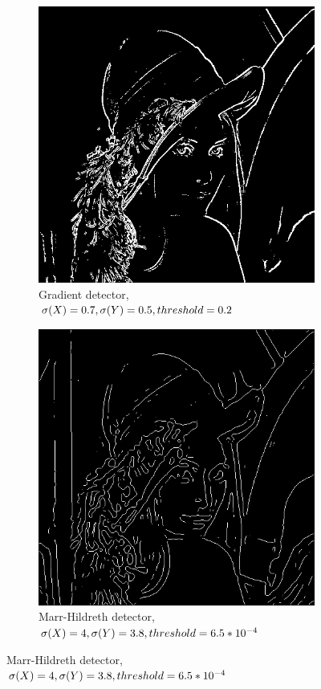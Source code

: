 \documentclass[a4paper]{article}
\begin{document}
\begin{figure}
\begin{subfigure}[b]{0.3\textwidth}
                \includegraphics[width=\textwidth]{q1-lena-mag.png}
                \caption{Gradient detector, \\$\sigma (X) = 0.7,  \sigma (Y) = 0.5, \\threshold = 0.2$}
                \label{fig:2b}
                
        \end{subfigure}
        \begin{subfigure}[b]{0.3\textwidth}
                \centering
                \includegraphics[width=\textwidth]{q1-lena-mh.png}
                \caption{Marr-Hildreth detector, \\$\sigma (X) = 4, \sigma (Y) = 3.8, \\threshold = 6.5*10^{-4}$}
                \label{fig:2c}
                

\end{subfigure}
\end{figure}
\end{document}
